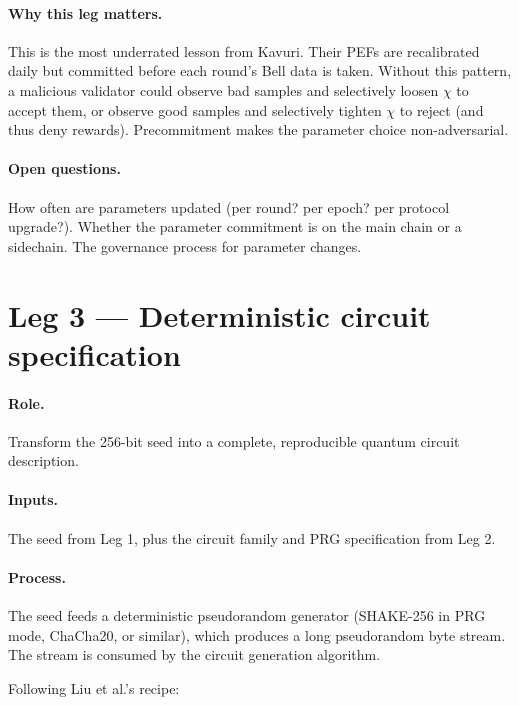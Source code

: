 \documentclass[11pt]{article}
\begin{document}
\paragraph{Why this leg matters.} This is the most underrated lesson from Kavuri. Their PEFs are recalibrated daily but committed before each round's Bell data is taken. Without this pattern, a malicious validator could observe bad samples and selectively loosen $\chi$ to accept them, or observe good samples and selectively tighten $\chi$ to reject (and thus deny rewards). Precommitment makes the parameter choice non-adversarial.

\paragraph{Open questions.} How often are parameters updated (per round? per epoch? per protocol upgrade?). Whether the parameter commitment is on the main chain or a sidechain. The governance process for parameter changes.

\section{Leg 3 --- Deterministic circuit specification}

\paragraph{Role.} Transform the 256-bit seed into a complete, reproducible quantum circuit description.

\paragraph{Inputs.} The seed from Leg 1, plus the circuit family and PRG specification from Leg 2.

\paragraph{Process.} The seed feeds a deterministic pseudorandom generator (SHAKE-256 in PRG mode, ChaCha20, or similar), which produces a long pseudorandom byte stream. The stream is consumed by the circuit generation algorithm.

Following Liu et al.'s recipe:
\end{document}
